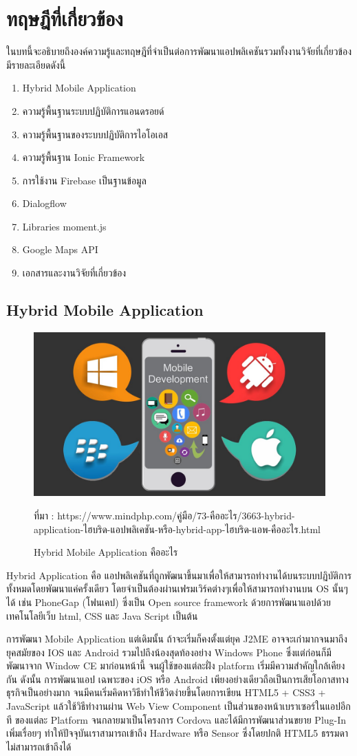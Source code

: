 \chapter{ทฤษฎีที่เกี่ยวข้อง}
ในบทนี้จะอธิบายถึงองค์ความรู้และทฤษฎีที่จำเป็นต่อการพัฒนาแอปพลิเคชันรวมทั้งงานวิจัยที่เกี่ยวข้อง มีรายละเอียดดังนี้
\begin{enumerate}[label=2.\arabic*]
	\item Hybrid Mobile Application
	\item ความรู้พื้นฐานระบบปฏิบัติการแอนดรอยด์
	\item ความรู้พื้นฐานของระบบปฏิบัติการไอโอเอส
	\item ความรู้พื้นฐาน Ionic Framework
	\item การใช้งาน Firebase เป็นฐานข้อมูล
	\item Dialogflow
	\item Libraries moment.js
	\item Google Maps API
	\item เอกสารและงานวิจัยที่เกี่ยวข้อง
\end{enumerate}

\section{Hybrid Mobile Application}

\begin{figure}[H]
	\centering
	\includegraphics[width=0.5\columnwidth]{Figures/2/hybrid}
	\caption{Hybrid Mobile Application คืออะไร}{ที่มา :  https://www.mindphp.com/คู่มือ/73-คืออะไร/3663-hybrid-application-ไฮบริด-แอปพลิเคชัน-หรือ-hybrid-app-ไฮบริด-แอพ-คืออะไร.html}
	\label{Fig:hybrid}
\end{figure}

Hybrid Application คือ แอปพลิเคชันที่ถูกพัฒนาขึ้นมาเพื่อให้สามารถทำงานได้บนระบบปฏิบัติการทั้งหมดโดยพัฒนาแค่ครั้งเดียว 
โดยจำเป็นต้องผ่านเฟรมเวิร์คต่างๆเพื่อให้สามารถทำงานบน OS นั้นๆได้ เช่น PhoneGap (โฟนเคป) ซึ่งเป็น Open source framework 
ด้วยการพัฒนาแอปด้วยเทคโนโลยีเว็บ html, CSS และ Java Script เป็นต้น 

การพัฒนา Mobile Application แต่เดิมนั้น ถ้าจะเริ่มก็คงตั้งแต่ยุค J2ME อาจจะเก่ามากจนมาถึงยุคสมัยของ IOS และ Android 
รวมไปถึงน้องสุดท้องอย่าง Windows Phone 
ซึ่งแต่ก่อนก็มีพัฒนาจาก Window CE มาก่อนหน้านี้ จนผู้ใช้ของแต่ละฝั่ง platform เริ่มมีความสำคัญใกล้เคียงกัน ดังนั้น การพัฒนาแอป
เฉพาะของ iOS หรือ Android เพียงอย่างเดียวถือเป็นการเสียโอกาสทางธุรกิจเป็นอย่างมาก จนมีคนเริ่มคิดหาวิธีทำให้ชีวิตง่ายขึ้นโดยการเขียน 
HTML5 + CSS3 + JavaScript แล้วใช้วิธีทำงานผ่าน Web View Component เป็นส่วนของหน้าเบราเซอร์ในแอปอีกที ของแต่ละ Platform 
จนกลายมาเป็นโครงการ Cordova และได้มีการพัฒนาส่วนขยาย Plug-In เพิ่มเรื่อยๆ ทำให้ปัจจุบันเราสามารถเข้าถึง Hardware หรือ Sensor 
ซึ่งโดยปกติ HTML5 ธรรมดาไม่สามารถเข้าถึงได้ 

